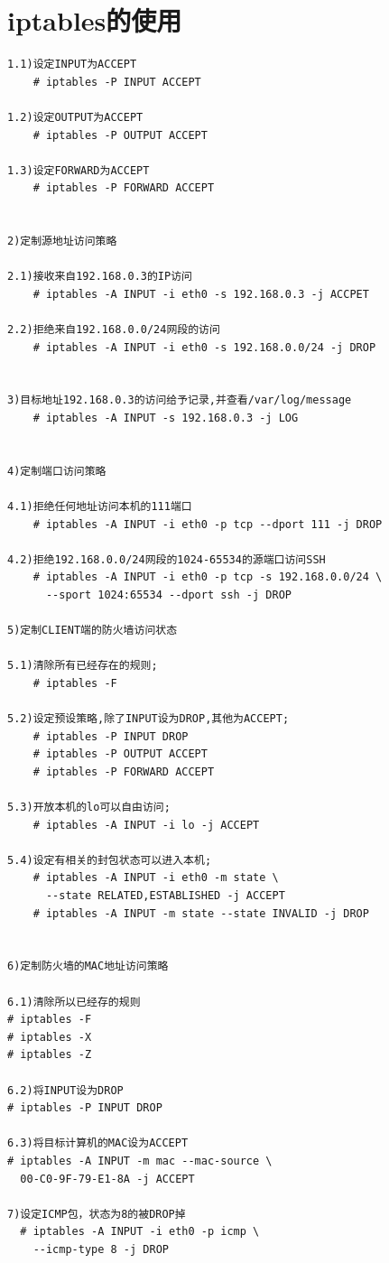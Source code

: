 \section{iptables的使用}
\label{sec_iptables}


\begin{verbatim}
1.1)设定INPUT为ACCEPT 
    # iptables -P INPUT ACCEPT

1.2)设定OUTPUT为ACCEPT
    # iptables -P OUTPUT ACCEPT

1.3)设定FORWARD为ACCEPT
    # iptables -P FORWARD ACCEPT


2)定制源地址访问策略

2.1)接收来自192.168.0.3的IP访问
    # iptables -A INPUT -i eth0 -s 192.168.0.3 -j ACCPET

2.2)拒绝来自192.168.0.0/24网段的访问
    # iptables -A INPUT -i eth0 -s 192.168.0.0/24 -j DROP
 

3)目标地址192.168.0.3的访问给予记录,并查看/var/log/message
    # iptables -A INPUT -s 192.168.0.3 -j LOG


4)定制端口访问策略

4.1)拒绝任何地址访问本机的111端口
    # iptables -A INPUT -i eth0 -p tcp --dport 111 -j DROP

4.2)拒绝192.168.0.0/24网段的1024-65534的源端口访问SSH
    # iptables -A INPUT -i eth0 -p tcp -s 192.168.0.0/24 \
      --sport 1024:65534 --dport ssh -j DROP

5)定制CLIENT端的防火墙访问状态

5.1)清除所有已经存在的规则;
    # iptables -F

5.2)设定预设策略,除了INPUT设为DROP,其他为ACCEPT;
    # iptables -P INPUT DROP
    # iptables -P OUTPUT ACCEPT
    # iptables -P FORWARD ACCEPT

5.3)开放本机的lo可以自由访问;
    # iptables -A INPUT -i lo -j ACCEPT

5.4)设定有相关的封包状态可以进入本机;
    # iptables -A INPUT -i eth0 -m state \
      --state RELATED,ESTABLISHED -j ACCEPT
    # iptables -A INPUT -m state --state INVALID -j DROP


6)定制防火墙的MAC地址访问策略

6.1)清除所以已经存的规则
# iptables -F
# iptables -X
# iptables -Z

6.2)将INPUT设为DROP
# iptables -P INPUT DROP

6.3)将目标计算机的MAC设为ACCEPT
# iptables -A INPUT -m mac --mac-source \
  00-C0-9F-79-E1-8A -j ACCEPT

7)设定ICMP包，状态为8的被DROP掉
  # iptables -A INPUT -i eth0 -p icmp \
    --icmp-type 8 -j DROP


\end{verbatim}
